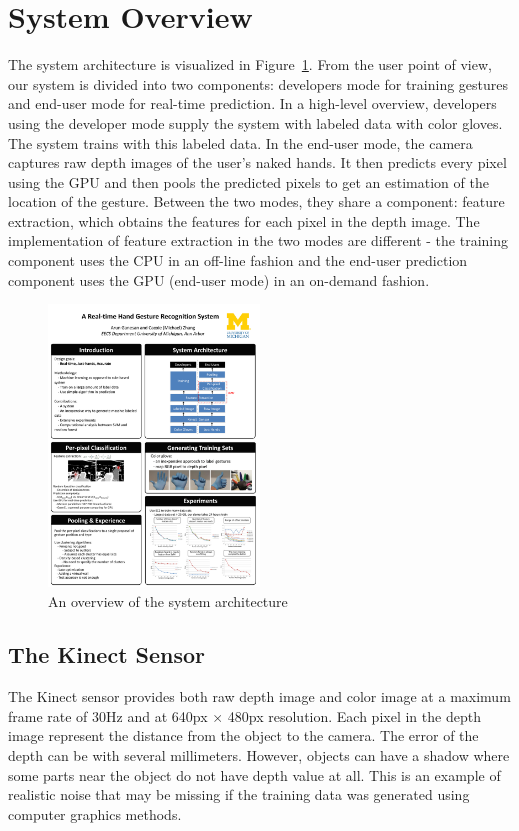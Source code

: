 \section{System Overview}
\label{sec: system}
\cutsection

The system architecture is visualized in Figure~\ref{fig: architecture}. From the user point of view, our system is divided into two components: developers mode for training gestures and end-user mode for real-time prediction. In a high-level overview, developers using the developer mode supply the system with labeled data with color gloves. The system trains with this labeled data. In the end-user mode, the camera captures raw depth images of the user's naked hands. It then predicts every pixel using the GPU and then pools the predicted pixels to get an estimation of the location of the gesture. Between the two modes, they share a component: feature extraction, which obtains the features for each pixel in the depth image. The implementation of feature extraction in the two modes are different - the training component uses the CPU in an off-line fashion and the end-user prediction component uses the GPU (end-user mode) in an on-demand fashion. 
\cutequation
\begin{figure}
\centering
	\includegraphics[width=0.5\textwidth]{fig/SystemArchitecture.pdf}
	\cutcaption
	\caption{An overview of the system architecture}
    \label{fig: architecture}
\end{figure}
\cutequation

\cutsection
\subsection{The Kinect Sensor}
\cutsection

The Kinect sensor provides both raw depth image and color image at a maximum frame rate of 30Hz and at 640px $\times$ 480px resolution. Each pixel in the depth image represent the distance from the object to the camera. The error of the depth can be with several millimeters. However, objects can have a shadow where some parts near the object do not have depth value at all. This is an example of realistic noise that may be missing if the training data was generated using computer graphics methods.